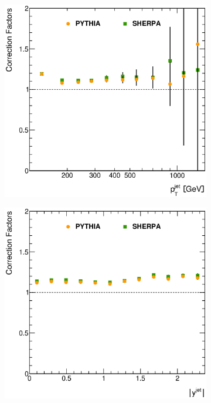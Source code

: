 \documentclass[12pt, twoside]{article}
\numberwithin{equation}{section}
\numberwithin{figure}{section}
\newenvironment{changemargin}[2]{%
\begin{list}{}{%
\setlength{\topsep}{0pt}%
\setlength{\leftmargin}{#1}%
\setlength{\rightmargin}{#2}%
\setlength{\listparindent}{\parindent}%
\setlength{\itemindent}{\parindent}%
\setlength{\parsep}{\parskip}%
}%
\item[]}{\end{list}}
\begin{document}
\begin{figure}
\begin{changemargin}{-1.0cm}{-0.75cm}
\begin{changemargin}{-0.75cm}{-1.0cm}
        \vspace{0.2cm}
        \begin{subfigure}[b]{0.37\textwidth}
            \includegraphics[width=\textwidth]{./images/CorrectionFactors/CORR_FACT-104.eps}
            \subcaption{}
            \label{fig:CorrectionFactorPtJet}
        \end{subfigure}
        \begin{subfigure}[b]{0.37\textwidth}
            \includegraphics[width=\textwidth]{./images/CorrectionFactors/CORR_FACT-105.eps}

\end{subfigure}
\end{changemargin}
\end{changemargin}
\end{figure}
\end{document}
